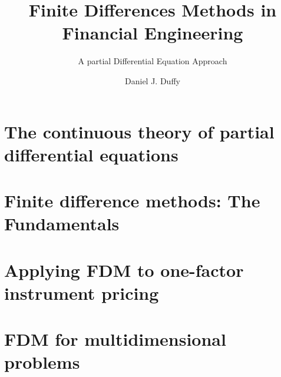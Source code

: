 \documentclass[
	a4paper,
	10pt,
	oneside
]{scrbook}
\begin{document}
\title{
	Finite Differences Methods in Financial Engineering
}
\subtitle{
	A partial Differential Equation Approach
}

\author{Daniel J. Duffy}

\maketitle

\frontmatter

\tableofcontents
\lstlistoflistings
\listofalgorithms

\hypersetup{pageanchor=false}

\mainmatter



\part{The continuous theory of partial differential equations}

\begingroup
\let\clearpage\relax





\endgroup

\part{Finite difference methods: The Fundamentals}

\begingroup
\let\clearpage\relax






\endgroup

\part{Applying FDM to one-factor instrument pricing}

\begingroup
\let\clearpage\relax






\endgroup

\part{FDM for multidimensional problems}

\begingroup
\let\clearpage\relax




\endgroup
\end{document}
